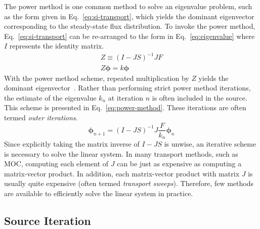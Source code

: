 The power method is one common method to solve an eigenvalue problem, such as the form given in Eq.~\ref{eq:si-transport}, which yields the dominant eigenvector corresponding to the steady-state flux distribution. To invoke the power method, Eq.~\ref{eq:si-transport} can be re-arranged to the form in Eq.~\ref{eq:eigenvalue} where $I$ represents the identity matrix.
\begin{equation}
\begin{split}
Z \equiv \left(I-JS\right)^{-1} JF \\
Z \boldsymbol{\phi} =  k \boldsymbol{\phi}
\end{split}
\label{eq:eigenvalue}
\end{equation}
With the power method scheme, repeated multiplication by $Z$ yields the dominant eigenvector~\cite{numerical-analysis}. Rather than performing strict power method iterations, the estimate of the eigenvalue $k_n$ at iteration $n$ is often included in the source. This scheme is presented in Eq.~\ref{eq:power-method}. These iterations are often termed \textit{outer iterations}.
\begin{equation}
\boldsymbol{\phi}_{n+1} =  \left(I-JS\right)^{-1} J\frac{F}{k_n} \boldsymbol{\phi}_n
\label{eq:power-method}
\end{equation}
Since explicitly taking the matrix inverse of $I-JS$ is unwise, an iterative scheme is necessary to solve the linear system. In many transport methods, such as \ac{MOC}, computing each element of $J$ can be just as expensive as computing a matrix-vector product. In addition, each matrix-vector product with matrix $J$ is usually quite expensive (often termed \textit{transport sweeps}). Therefore, few methods are available to efficiently solve the linear system in practice. 

\subsection{Source Iteration}

